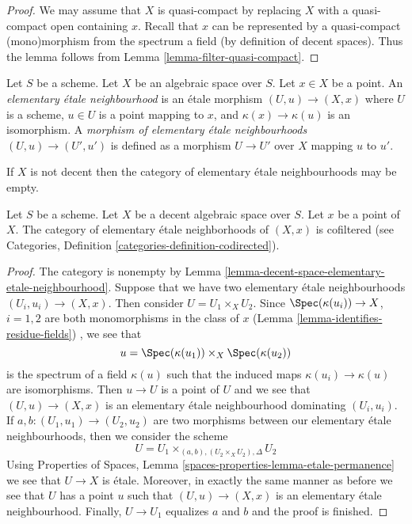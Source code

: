 \begin{proof}
We may assume that $X$ is quasi-compact by replacing $X$ with a
quasi-compact open containing $x$. Recall that $x$ can be
represented by a quasi-compact (mono)morphism
from the spectrum a field (by definition of decent spaces). Thus the
lemma follows from Lemma \ref{lemma-filter-quasi-compact}.
\end{proof}

\begin{definition}
\label{definition-elemenary-etale-neighbourhood}
Let $S$ be a scheme. Let $X$ be an algebraic space over $S$.
Let $x \in X$ be a point. An {\it elementary \'etale neighbourhood}
is an \'etale morphism $(U, u) \to (X, x)$ where $U$ is a scheme,
$u \in U$ is a point mapping to $x$, and $\kappa(x) \to \kappa(u)$
is an isomorphism. A {\it morphism of elementary \'etale neighbourhoods}
$(U, u) \to (U', u')$ is defined as a morphism $U \to U'$
over $X$ mapping $u$ to $u'$.
\end{definition}

\noindent
If $X$ is not decent then the category of elementary \'etale neighbourhoods
may be empty.

\begin{lemma}
\label{lemma-elementary-etale-neighbourhoods}
Let $S$ be a scheme. Let $X$ be a decent algebraic space over $S$.
Let $x$ be a point of $X$.
The category of elementary \'etale neighborhoods of $(X, x)$
is cofiltered (see
Categories, Definition \ref{categories-definition-codirected}).
\end{lemma}

\begin{proof}
The category is nonempty by
Lemma \ref{lemma-decent-space-elementary-etale-neighbourhood}.
Suppose that we have two elementary \'etale neighbourhoods
$(U_i, u_i) \to (X, x)$.
Then consider $U = U_1 \times_X U_2$. Since
$\Spec(\kappa(u_i)) \to X$, $i = 1, 2$ are both monomorphisms
in the class of $x$ (Lemma \ref{lemma-identifies-residue-fields})
, we see that
$$
u = \Spec(\kappa(u_1)) \times_X \Spec(\kappa(u_2))
$$
is the spectrum of a field $\kappa(u)$ such that the induced maps
$\kappa(u_i) \to \kappa(u)$ are isomorphisms. Then $u \to U$ is a point
of $U$ and we see that $(U, u) \to (X, x)$ is an elementary
\'etale neighbourhood dominating $(U_i, u_i)$.
If $a, b : (U_1, u_1) \to (U_2, u_2)$ are two morphisms between
our elementary \'etale neighbourhoods, then we consider the scheme
$$
U = U_1 \times_{(a, b), (U_2 \times_X U_2), \Delta} U_2
$$
Using Properties of Spaces, Lemma
\ref{spaces-properties-lemma-etale-permanence}
we see that $U \to X$ is \'etale. Moreover, in exactly the same manner
as before we see that $U$ has a point $u$
such that $(U, u) \to (X, x)$ is an elementary
\'etale neighbourhood. Finally, $U \to U_1$ equalizes $a$ and $b$
and the proof is finished.
\end{proof}

